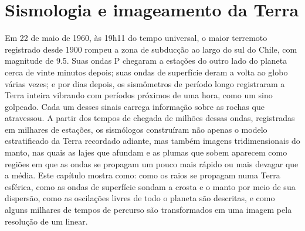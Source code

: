 \chapter{Sismologia e imageamento da Terra}\label{ch:b3:seismology-imaging}

Em 22 de maio de 1960, às 19h11 do tempo universal, o maior terremoto registrado desde
1900 rompeu a zona de subducção ao largo do sul do Chile, com magnitude de 9.5.
Suas ondas P chegaram a estações do outro lado do planeta cerca de vinte minutos
depois; suas ondas de superfície deram a volta ao globo várias vezes; e por dias
depois, os sismômetros de período longo registraram a Terra inteira vibrando com
períodos próximos de uma hora, como um sino golpeado. Cada um desses sinais carrega
informação sobre as rochas que atravessou. A partir dos tempos de chegada de milhões
dessas ondas, registradas em milhares de estações, os sismólogos construíram não apenas
o modelo estratificado da Terra recordado adiante, mas também imagens tridimensionais do
manto, nas quais as lajes que afundam e as plumas que sobem aparecem como regiões em que
as ondas se propagam um pouco mais rápido ou mais devagar que a média. Este capítulo mostra como:
como os raios se propagam numa Terra esférica, como as ondas de superfície sondam a crosta
e o manto por meio de sua dispersão, como as oscilações livres de todo o
planeta são descritas, e como alguns milhares de tempos de percurso são transformados em uma
imagem pela resolução de um  linear.

